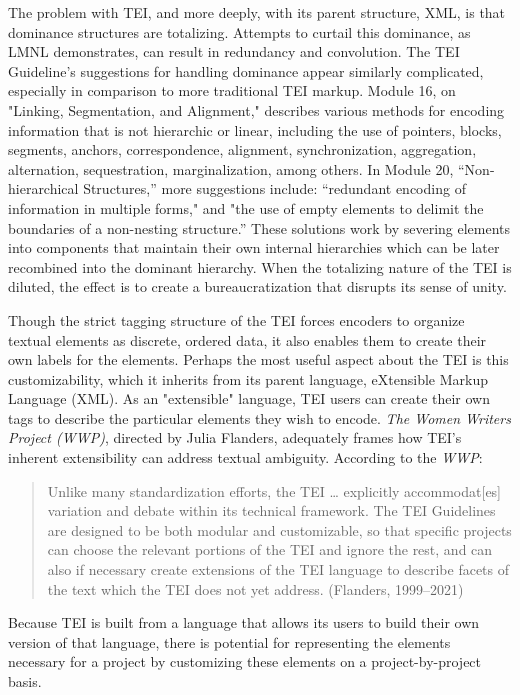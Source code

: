 \documentclass[11pt]{article}
\begin{document}
The problem with TEI, and more deeply, with its parent structure, XML,
is that dominance structures are totalizing. Attempts to curtail this
dominance, as LMNL demonstrates, can result in redundancy and
convolution. The TEI Guideline’s suggestions for handling dominance
appear similarly complicated, especially in comparison to more
traditional TEI markup. Module 16, on "Linking, Segmentation, and
Alignment," describes various methods for encoding information that is
not hierarchic or linear, including the use of pointers, blocks,
segments, anchors, correspondence, alignment, synchronization,
aggregation, alternation, sequestration, marginalization, among
others. In Module 20, “Non-hierarchical Structures,” more suggestions
include: “redundant encoding of information in multiple forms," and
"the use of empty elements to delimit the boundaries of a non-nesting
structure.” These solutions work by severing elements into components
that maintain their own internal hierarchies which can be later
recombined into the dominant hierarchy. When the totalizing nature of
the TEI is diluted, the effect is to create a bureaucratization that
disrupts its sense of unity.

Though the strict tagging structure of the TEI forces encoders to
organize textual elements as discrete, ordered data, it also enables
them to create their own labels for the elements. Perhaps the most
useful aspect about the TEI is this customizability, which it inherits
from its parent language, eXtensible Markup Language (XML). As an
"extensible" language, TEI users can create their own tags to describe
the particular elements they wish to encode. \emph{The Women Writers
Project (WWP)}, directed by Julia Flanders, adequately frames how
TEI's inherent extensibility can address textual ambiguity. According
to the \emph{WWP}:
\begin{quote}
Unlike many standardization efforts, the TEI \ldots{} explicitly
accommodat[es] variation and debate within its technical
framework. The TEI Guidelines are designed to be both modular and
customizable, so that specific projects can choose the relevant
portions of the TEI and ignore the rest, and can also if necessary
create extensions of the TEI language to describe facets of the text
which the TEI does not yet address. (Flanders, 1999--2021)
\end{quote}
Because TEI is built from a language that allows its users to build
their own version of that language, there is potential for
representing the elements necessary for a project by customizing these
elements on a project-by-project basis.
\end{document}
